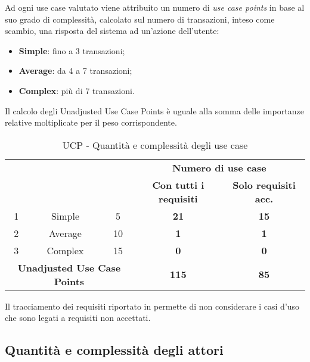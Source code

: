 Ad ogni use case valutato viene attribuito un numero di \emph{use case points} in base al suo grado di complessità, calcolato sul numero di transazioni, inteso come scambio, una risposta del sistema ad un'azione dell'utente:

\begin{itemize}
	\item \textbf{Simple}: fino a 3 transazioni;
	\item \textbf{Average}: da 4 a 7 transazioni;
	\item \textbf{Complex}: più di 7 transazioni.
\end{itemize}

Il calcolo degli Unadjusted Use Case Points è uguale alla somma delle importanze relative moltiplicate per il peso corrispondente.

\begin{table}[H]
\begin{adjustwidth}{-4cm}{-4cm}
	\begin{center}
		\begin{tabular}{|c|c|c|c|c|}
			\hline
			\multicolumn{ 2}{|c|}{\raisebox{-1\height}{\textbf{Use Case Points grezzi}}} & \multicolumn{ 1}{c|}{\raisebox{-1\height}{\textbf{Peso}}} & \multicolumn{ 2}{c|}{\textbf{Numero di use case}} \\ \cline{ 4- 5}
			\multicolumn{ 2}{|c|}{\textbf{}} & \multicolumn{ 1}{c|}{} & \textbf{Con tutti i requisiti} & \textbf{Solo requisiti acc.} \\ \hline
			1 & Simple & 5 & \textbf{21} & \textbf{15} \\ \hline
			2 & Average & 10 & \textbf{1} & \textbf{1} \\ \hline
			3 & Complex & 15 & \textbf{0} & \textbf{0} \\ \hline
			\multicolumn{ 3}{|c|}{\textbf{Unadjusted Use Case Points}} & \textbf{115} & \textbf{85} \\ \hline
		\end{tabular}
	\end{center}
\caption{UCP - Quantità e complessità degli use case}
\end{adjustwidth}
\end{table}

Il tracciamento dei requisiti riportato in \AnalisiDeiRequisiti{} permette di non considerare i casi d'uso che sono legati a requisiti non accettati.


\subsection{Quantità e complessità degli attori}

